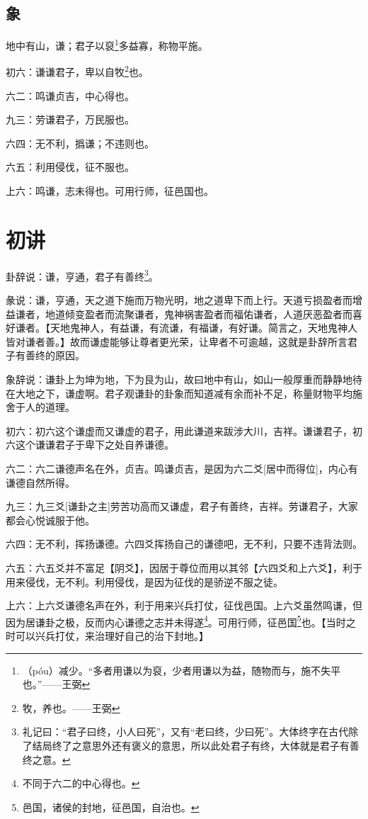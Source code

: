 \documentclass[12pt,oneside]{book}
\begin{document}
\subsection{象}
地中有山，谦；君子以裒\footnote{（póu）减少。“多者用谦以为裒，少者用谦以为益，随物而与，施不失平也。”——王弼}多益寡，称物平施。

初六：谦谦君子，卑以自牧\footnote{牧，养也。——王弼}也。

六二：鸣谦贞吉，中心得也。

九三：劳谦君子，万民服也。

六四：无不利，撝谦；不违则也。

六五：利用侵伐，征不服也。

上六：鸣谦，志未得也。可用行师，征邑国也。

\section{初讲}
卦辞说：谦，亨通，君子有善终\footnote{礼记曰：“君子曰终，小人曰死”，又有“老曰终，少曰死”。大体终字在古代除了结局终了之意思外还有褒义的意思，所以此处君子有终，大体就是君子有善终之意。}。

彖说：谦，亨通，天之道下施而万物光明，地之道卑下而上行。天道亏损盈者而增益谦者，地道倾变盈者而流聚谦者，鬼神祸害盈者而福佑谦者，人道厌恶盈者而喜好谦者。【天地鬼神人，有益谦，有流谦，有福谦，有好谦。简言之，天地鬼神人皆对谦者善。】故而谦虚能够让尊者更光荣，让卑者不可逾越，这就是卦辞所言君子有善终的原因。

象辞说：谦卦上为坤为地，下为艮为山，故曰地中有山，如山一般厚重而静静地待在大地之下，谦虚啊。君子观谦卦的卦象而知道减有余而补不足，称量财物平均施舍于人的道理。

初六：初六这个谦虚而又谦虚的君子，用此谦道来跋涉大川，吉祥。谦谦君子，初六这个谦谦君子于卑下之处自养谦德。

六二：六二谦德声名在外，贞吉。鸣谦贞吉，是因为六二爻[居中而得位]，内心有谦德自然所得。

九三：九三爻[谦卦之主]劳苦功高而又谦虚，君子有善终，吉祥。劳谦君子，大家都会心悦诚服于他。

六四：无不利，挥扬谦德。六四爻挥扬自己的谦德吧，无不利，只要不违背法则。

六五：六五爻并不富足【阴爻】，因居于尊位而用以其邻【六四爻和上六爻】，利于用来侵伐，无不利。利用侵伐，是因为征伐的是骄逆不服之徒。

上六：上六爻谦德名声在外，利于用来兴兵打仗，征伐邑国。上六爻虽然鸣谦，但因为居谦卦之极，反而内心谦德之志并未得遂\footnote{不同于六二的中心得也。}。可用行师，征邑国\footnote{邑国，诸侯的封地，征邑国，自治也。}也。【当时之时可以兴兵打仗，来治理好自己的治下封地。】
\end{document}
